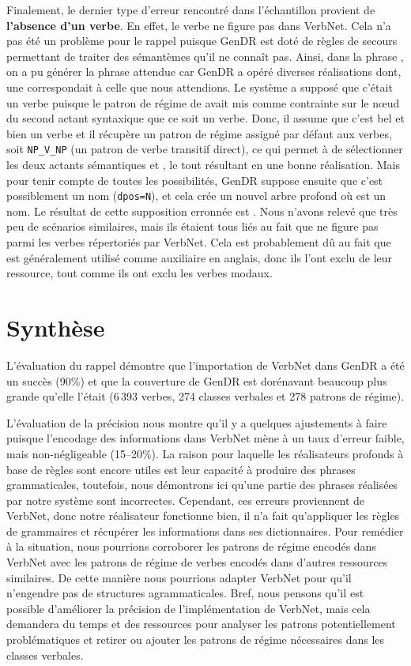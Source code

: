 Finalement, le dernier type d'erreur rencontré dans l'échantillon provient de \textbf{l'absence d'un verbe}. En effet, le verbe  ne figure pas dans VerbNet. Cela n'a pas été un problème pour le rappel puisque GenDR est doté de règles de secours permettant de traiter des sémantèmes qu'il ne connaît pas. Ainsi, dans la phrase , on a pu générer la phrase attendue car GenDR a opéré diverses réalisations dont, une correspondait à celle que nous attendions. Le système a supposé que c'était un verbe puisque le patron de régime de  avait mis comme contrainte sur le n\oe{}ud du second actant syntaxique que ce soit un verbe. Donc, il assume que c'est bel et bien un verbe et il récupère un patron de régime assigné par défaut aux verbes, soit \texttt{NP\_V\_NP} (un patron de verbe transitif direct), ce qui permet à  de sélectionner les deux actants sémantiques  et , le tout résultant en une bonne réalisation. Mais pour tenir compte de toutes les possibilités, GenDR suppose ensuite que c'est possiblement un nom (\texttt{dpos=N}), et cela crée un nouvel arbre profond où  est un nom. Le résultat de cette supposition erronnée est \ungr{}. Nous n'avons relevé que très peu de scénarios similaires, mais ils étaient tous liés au fait que  ne figure pas parmi les verbes répertoriés par VerbNet. Cela est probablement dû au fait que  est généralement utilisé comme auxiliaire en anglais, donc ils l'ont exclu de leur ressource, tout comme ils ont exclu les verbes modaux.

\section{Synthèse}

L'évaluation du rappel démontre que l'importation de VerbNet dans GenDR a été un succès (90\%) et que la couverture de GenDR est dorénavant beaucoup plus grande qu'elle l'était (6\,393 verbes, 274 classes verbales et 278 patrons de régime).

L'évaluation de la précision nous montre qu'il y a quelques ajustements à faire puisque l'encodage des informations dans VerbNet mène à un taux d'erreur faible, mais non-négligeable (15--20\%). La raison pour laquelle les réalisateurs profonds à base de règles sont encore utiles est leur capacité à produire des phrases grammaticales, toutefois, nous démontrons ici qu'une partie des phrases réalisées par notre système sont incorrectes. Cependant, ces erreurs proviennent de VerbNet, donc notre réalisateur fonctionne bien, il n'a fait qu'appliquer les règles de grammaires et récupérer les informations dans ses dictionnaires. Pour remédier à la situation, nous pourrions corroborer les patrons de régime encodés dans VerbNet avec les patrons de régime de verbes encodés dans d'autres ressources similaires. De cette manière nous pourrions adapter VerbNet pour qu'il n'engendre pas de structures agrammaticales. Bref, nous pensons qu'il est possible d'améliorer la précision de l'implémentation de VerbNet, mais cela demandera du temps et des ressources pour analyser les patrons potentiellement problématiques et retirer ou ajouter les patrons de régime nécessaires dans les classes verbales.

